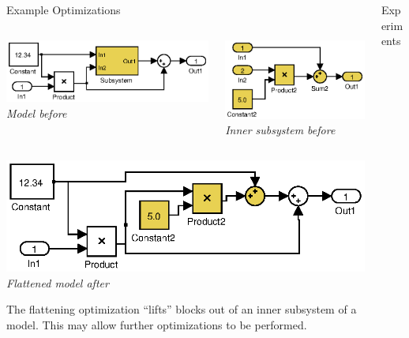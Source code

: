 \documentclass[final,hyperref={pdfpagelabels=false}]{beamer}
\begin{document}
\begin{frame}{}
\begin{columns}[t]
\begin{column}{.585\linewidth}
\begin{block}{Example Optimizations}
\begin{columns}[c]
\begin{column}{.485\linewidth}
\begin{center}
         \includegraphics[width=0.8\linewidth]{images/models/Flatten1}\\
         \footnotesize \textit{Model before}
         \end{center}
         \end{column}
         \begin{column}{.485\linewidth}
         \begin{center}
         \includegraphics[width=0.6\linewidth]{images/models/Flatten1_subsystem}\\
         \footnotesize \textit{Inner subsystem before}
         \end{center}
         \end{column}
         \end{columns}
         \begin{center}
          \includegraphics[width=0.5\linewidth]{images/models/Flatten1_export}\\
          \footnotesize \textit{Flattened model after}
          \end{center}
         \footnotesize
         The flattening optimization ``lifts'' blocks out of an inner subsystem of a model. This may allow further optimizations to be performed.
         
        \end{block}
      \end{column}

     \begin{column}{.385\linewidth}
             \begin{block}{Experiments}
             \footnotesize
             \begin{table}[h]
             

\end{table}
\end{block}
\end{column}
\end{columns}
\end{frame}
\end{document}
